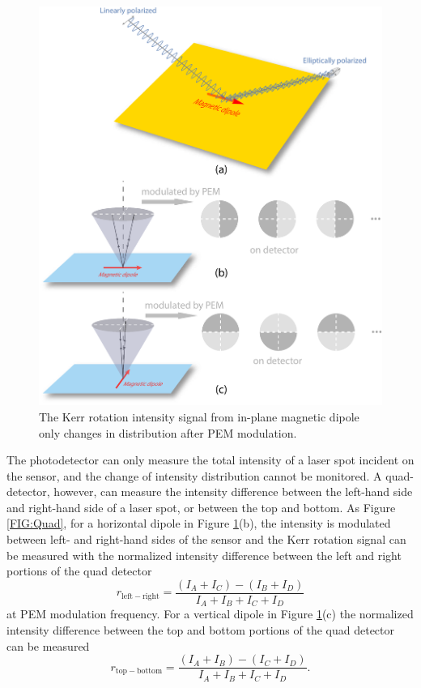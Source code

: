 \documentclass[pdflatex, sectionletters, 12pt]{pittetd}    %
\begin{document}
\begin{figure}[p]
	\centering
	\includegraphics[width=.9\textwidth]{Drawing/KerrInPlane.pdf}
	\caption{The Kerr rotation intensity signal from in-plane magnetic dipole only changes in distribution after PEM modulation.}
	\label{FIG:KerrInPlane}
\end{figure}

The photodetector can only measure the total intensity of a laser spot incident on the sensor, and the change of intensity distribution cannot be monitored. A quad-detector, however, can measure the intensity difference between the left-hand side and right-hand side of a laser spot, or between the top and bottom. As Figure \ref{FIG:Quad}, for a horizontal dipole in Figure \ref{FIG:KerrInPlane}(b), the intensity is modulated between left- and right-hand sides of the sensor and the Kerr rotation signal can be measured with the normalized intensity difference between the left and right portions of the quad detector
$$
r_\mathrm{left-right} = \frac{(I_A + I_C) - (I_B + I_D)}{I_A + I_B + I_C + I_D}
$$
at PEM modulation frequency. For a vertical dipole in Figure \ref{FIG:KerrInPlane}(c) the normalized intensity difference between the top and bottom portions of the quad detector can be measured
$$
r_\mathrm{top-bottom} = \frac{(I_A + I_B) - (I_C + I_D)}{I_A + I_B + I_C + I_D}.
$$
\\
\end{document}
